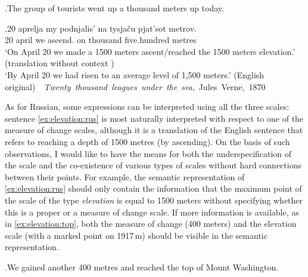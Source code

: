 \ex.\label{ex:elevation}The group of tourists went up a thousand meters up today.

\exg.\label{ex:elevation:rus}20 aprelja my podnjalis' na tysja\v{c}u pjat'sot metrov.\\
20 april we ascend. on thousand five.hundred metres\\
\trans `On April 20 we made a 1500 meters ascent/reached the 1500 meters elevation.' (translation without context  )\\
`By April 20 we had risen to an average level of 1,500 meters.' (English original)~~\hbox{}\hfill\hbox{\textit{Twenty thousand leagues under the sea}, Jules Verne, 1870}

As for Russian, some expressions can be interpreted using all the three scales: sentence \ref{ex:elevation:rus} is most naturally interpreted with respect to one of the measure of change scales, although it is a translation of the English sentence that refers to reaching a depth of 1500 metres (by ascending). On the basis of such observations, I would like to have the means for both the underspecification of the scale and the co-existence of various types of scales without hard connections between their points. For example, the semantic representation of \ref{ex:elevation:rus} should only contain the information that the maximum point of the scale of the type \textit{elevation} is equal to 1500 meters without specifying whether this is a proper or a measure of change scale. If more information is available, as in \ref{ex:elevation:top}, both the measure of change (400 meters) and the elevation scale (with a marked point on 1917\,m) should be visible in the semantic representation.

\ex.\label{ex:elevation:top}We gained another 400 metres and reached the top of Mount Washington.

